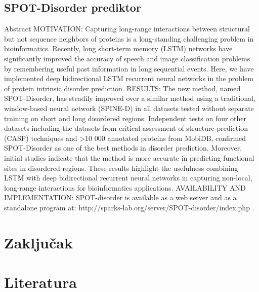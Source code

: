 \documentclass[a4paper]{article}
\begin{document}
\subsection{SPOT-Disorder prediktor}
Abstract
MOTIVATION:
Capturing long-range interactions between structural but not sequence neighbors of proteins is a long-standing challenging problem in bioinformatics. Recently, long short-term memory (LSTM) networks have significantly improved the accuracy of speech and image classification problems by remembering useful past information in long sequential events. Here, we have implemented deep bidirectional LSTM recurrent neural networks in the problem of protein intrinsic disorder prediction.
RESULTS:
The new method, named SPOT-Disorder, has steadily improved over a similar method using a traditional, window-based neural network (SPINE-D) in all datasets tested without separate training on short and long disordered regions. Independent tests on four other datasets including the datasets from critical assessment of structure prediction (CASP) techniques and >10 000 annotated proteins from MobiDB, confirmed SPOT-Disorder as one of the best methods in disorder prediction. Moreover, initial studies indicate that the method is more accurate in predicting functional sites in disordered regions. These results highlight the usefulness combining LSTM with deep bidirectional recurrent neural networks in capturing non-local, long-range interactions for bioinformatics applications.
AVAILABILITY AND IMPLEMENTATION:
SPOT-disorder is available as a web server and as a standalone program at: http://sparks-lab.org/server/SPOT-disorder/index.php .



\section{Zaključak}
\label{sec:zakljucak}

\appendix
 

\section{Literatura}
\end{document}
